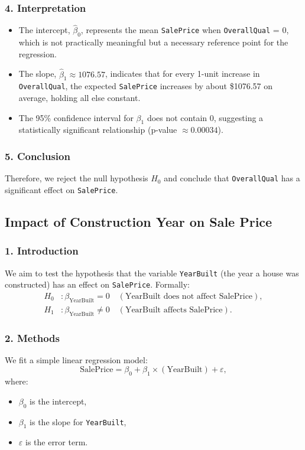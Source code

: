 \documentclass{article}
\begin{document}
\subsubsection*{4. Interpretation}

\begin{itemize}
    \item The intercept, \(\hat{\beta}_0\), represents the mean \texttt{SalePrice} when \texttt{OverallQual} = 0, which is not practically meaningful but a necessary reference point for the regression.
    \item The slope, \(\hat{\beta}_1\approx 1076.57\), indicates that for every 1-unit increase in \texttt{OverallQual}, the expected \texttt{SalePrice} increases by about \$1076.57 on average, holding all else constant.
    \item The 95\% confidence interval for \(\beta_1\) does not contain 0, suggesting a statistically significant relationship (p-value \(\approx 0.00034\)).
    
\end{itemize}

\subsubsection*{5. Conclusion}
Therefore, we reject the null hypothesis \(H_0\) and conclude that \texttt{OverallQual} has a significant effect on \texttt{SalePrice}.
\vspace{1em}

\subsection*{Impact of Construction Year on Sale Price}

\subsubsection*{1. Introduction}
We aim to test the hypothesis that the variable \texttt{YearBuilt} (the year a house was constructed) has an effect on \texttt{SalePrice}. Formally:
\[
\begin{aligned}
H_0 &: \beta_{\text{YearBuilt}} = 0 \quad (\text{YearBuilt does not affect SalePrice}),\\
H_1 &: \beta_{\text{YearBuilt}} \neq 0 \quad (\text{YearBuilt affects SalePrice}).
\end{aligned}
\]

\subsubsection*{2. Methods}
We fit a simple linear regression model:
\[
\text{SalePrice} = \beta_0 + \beta_1 \times (\text{YearBuilt}) + \varepsilon,
\]
where:
\begin{itemize}
    \item \(\beta_0\) is the intercept,
    \item \(\beta_1\) is the slope for \texttt{YearBuilt},
    \item \(\varepsilon\) is the error term.
\end{itemize}
\end{document}
